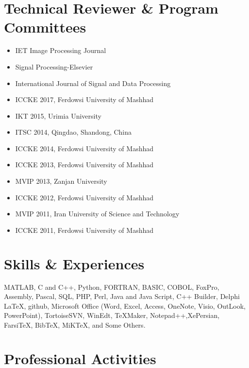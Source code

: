 \documentclass[10pt,a4paper]{moderncv}
\begin{document}
\section{Technical Reviewer \& Program Committees}

\begin{itemize}
\item IET Image Processing Journal
\item Signal Processing-Elsevier
\item International Journal of Signal and Data Processing
\item ICCKE 2017, Ferdowsi University of Mashhad
\item IKT 2015, Urimia University
\item ITSC 2014, Qingdao, Shandong, China
\item ICCKE 2014, Ferdowsi University of Mashhad
\item ICCKE 2013, Ferdowsi University of Mashhad
\item MVIP 2013, Zanjan University
\item ICCKE 2012, Ferdowsi University of Mashhad
\item MVIP 2011, Iran University of Science and Technology
\item ICCKE 2011, Ferdowsi University of Mashhad
\end{itemize}

\newpage
\section{Skills \& Experiences}
{MATLAB, C and C++, Python, FORTRAN, BASIC, COBOL, FoxPro,  Assembly, Pascal, SQL, PHP, Perl, Java and Java Script, C++ Builder, Delphi} {}{}{}{}
{ \LaTeX, github, Microsoft Office (Word, Excel, Access, OneNote, Visio,
 OutLook, PowerPoint), TortoiseSVN, WinEdt, TeXMaker, Notepad++,XePersian,
 Farsi\TeX, Bib\TeX, MiKTeX, and Some Others.} {}{}{}{} %

\section{Professional Activities}
\end{document}

